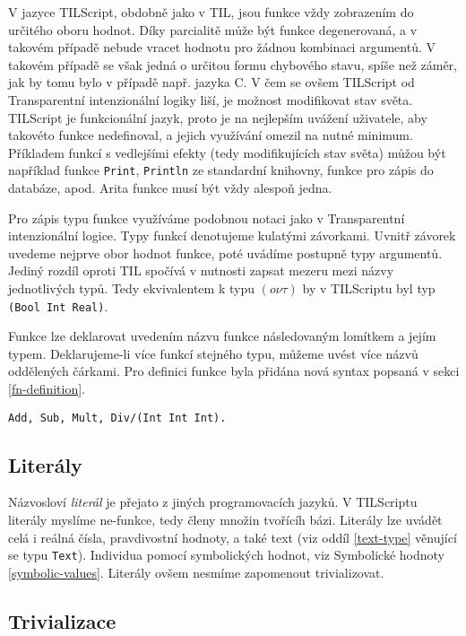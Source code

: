 V jazyce TILScript, obdobně jako v TIL, jsou funkce vždy zobrazením do určitého oboru hodnot. Díky
parcialitě může být funkce degenerovaná, a v takovém případě nebude vracet hodnotu pro žádnou
kombinaci argumentů. V takovém případě se však jedná o určitou formu chybového stavu, spíše než
záměr, jak by tomu bylo v případě např. jazyka C. V čem se ovšem TILScript od Transparentní
intenzionální logiky liší, je možnost modifikovat stav světa. TILScript je funkcionální jazyk,
proto je na nejlepším uvážení uživatele, aby takovéto funkce nedefinoval, a jejich využívání omezil
na nutné minimum. Příkladem funkcí s vedlejšími efekty (tedy modifikujících stav světa) můžou
být například funkce \lstinline{Print}, \lstinline{Println} ze standardní knihovny, funkce
pro zápis do databáze, apod. Arita funkce musí být vždy alespoň jedna.

Pro zápis typu funkce využíváme podobnou notaci jako v Transparentní intenzionální logice.
Typy funkcí denotujeme kulatými závorkami. Uvnitř závorek uvedeme nejprve obor hodnot funkce,
poté uvádíme postupně typy argumentů. Jediný rozdíl oproti TIL spočívá v nutnosti zapsat mezeru
mezi názvy jednotlivých typů. Tedy ekvivalentem k typu $(o\nu\tau)$ by v TILScriptu byl typ
\lstinline{(Bool Int Real)}.

Funkce lze deklarovat uvedením názvu funkce následovaným lomítkem a jejím typem. Deklarujeme-li
více funkcí stejného typu, můžeme uvést více názvů oddělených čárkami. Pro definici funkce byla
přidána nová syntax popsaná v sekci \ref{fn-definition}.

\begin{lstlisting}[caption={Deklarace funkcí}]
Add, Sub, Mult, Div/(Int Int Int).
\end{lstlisting}

\subsection{Literály}

Názvosloví \textit{literál} je přejato z jiných programovacích jazyků. V TILScriptu literály
myslíme ne-funkce, tedy členy množin tvořícíh bázi. Literály lze uvádět celá i reálná čísla,
pravdivostní hodnoty, a také text (viz oddíl \ref{text-type} věnující se typu \lstinline{Text}).
Individua pomocí symbolických hodnot, viz Symbolické hodnoty \ref{symbolic-values}. Literály ovšem
nesmíme zapomenout trivializovat.

\subsection{Trivializace}

